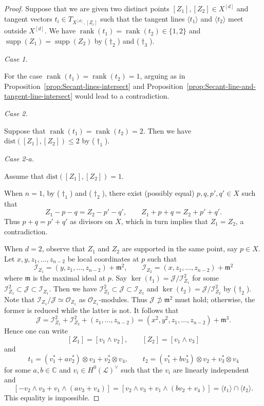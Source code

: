 \documentclass[a4paper]{amsart}
\numberwithin{equation}{section}
\theoremstyle{plain}
\theoremstyle{definition}
\theoremstyle{remark}
\numberwithin{figure}{section}
\numberwithin{table}{section}
\numberwithin{equation}{section}
\def \CC {\mathbb{C}}
\def \Ical {\mathcal{I}}
\def \Jcal {\mathcal{J}}
\def \Lcal {\mathcal{L}}
\def \Ocal {\mathcal{O}}
\def \mfr {\mathfrak{m}}
\DeclareMathOperator{\rank}{rank}
\DeclareMathOperator{\supp}{supp}
\begin{document}
\begin{proof}

Suppose that we are given two distinct points $[Z_1], [Z_2] \in X^{[d]}$ and tangent vectors $t_i \in T_{X^{[d]}, [Z_i]}$ such that the tangent lines $\langle t_1 \rangle$ and $\langle t_2 \rangle$ meet outside $X^{[d]}$.
We have $\rank(t_1) = \rank(t_2) \in \{ 1,2 \}$ and $\supp(Z_1) = \supp(Z_2)$ by (\hyperlink{dagger2}{$\dagger_2$}) and (\hyperlink{dagger3}{$\dagger_3$}).

\hypertarget{Case3-1}{\textit{Case 1.}}
For the case $\rank(t_1) = \rank(t_2) = 1$, arguing as in Proposition~\ref{prop:Secant-lines-intersect} and Proposition~\ref{prop:Secant-line-and-tangent-line-intersect} would lead to a contradiction.


\hypertarget{Case3-2}{\textit{Case 2.}} Suppose that $\rank(t_1) = \rank(t_2) = 2$.
Then we have $\mathrm{dist}([Z_1], [Z_2]) \leq 2$ by (\hyperlink{dagger1}{$\dagger_1$}).

\hypertarget{Case3-2-a}{\textit{Case 2-a.}} Assume that $\mathrm{dist}([Z_1],[Z_2]) = 1$.

When $n = 1$, by (\hyperlink{dagger1}{$\dagger_1$}) and (\hyperlink{dagger2}{$\dagger_2$}), there exist (possibly equal) $p, q, p', q' \in X$ such that
 \[
  Z_1 - p - q = Z_2 - p' - q', \qquad Z_1 + p + q = Z_2 + p' + q'.
 \]
Thus $p+q = p'+q'$ as divisors on $X$, which in turn implies that $Z_1 = Z_2$, a contradiction.

When $d = 2$, observe that $Z_1$ and $Z_2$ are supported in the same point, say $p \in X$.
Let $x,y,z_1, \dots, z_{n-2}$ be local coordinates at $p$ such that
 \[
  \Ical_{Z_1} = (y,z_1, \dots, z_{n-2}) + \mfr^2, \qquad
  \Ical_{Z_2} = (x,z_1, \dots, z_{n-2}) + \mfr^2
 \]
where $\mfr$ is the maximal ideal at $p$.
Say $\ker(t_1) = \Jcal/\Ical_{Z_1}^2$ for some $\Ical_{Z_1}^2 \subset \Jcal \subset \Ical_{Z_1}$.
Then we have $\Ical_{Z_2}^2 \subset \Jcal \subset \Ical_{Z_2}$ and $\ker(t_2) = \Jcal/\Ical_{Z_2}^2$ by (\hyperlink{dagger2}{$\dagger_2$}).
Note that $\Ical_{Z_1}/\Jcal \simeq \Ocal_{Z_1}$ as $\Ocal_{Z_1}$-modules.
Thus $\Jcal \not\supset \mfr^2$ must hold; otherwise, the former is reduced while the latter is not.
It follows that
 \[
  \Jcal = \Ical_{Z_1}^2 + \Ical_{Z_2}^2 + (z_1, \dots, z_{n-2}) = (x^2, y^2, z_1, \dots, z_{n-2}) + \mfr^3.
 \]
Hence one can write
 \[
  [Z_1] = [v_1 \wedge v_2], \qquad
  [Z_2] = [v_1 \wedge v_3]
 \]
and
 \[
  t_1 = (v_1^{\ast} + av_2^{\ast}) \otimes v_3 + v_2^{\ast} \otimes v_4, \qquad t_2 = (v_1^{\ast} + bv_3^{\ast}) \otimes v_2 + v_3^{\ast} \otimes v_4
 \]
for some $a,b \in \CC$ and $v_i \in H^0(\Lcal)^{\vee}$ such that the $v_i$ are linearly independent and
 \[
  [-v_2 \wedge v_3 + v_1 \wedge (av_3 + v_4)] =
  [v_2 \wedge v_3 + v_1 \wedge (bv_2 + v_4)] = \langle t_1 \rangle \cap \langle t_2 \rangle.
 \]
This equality is impossible.



\end{proof}
\end{document}
